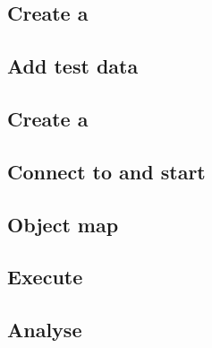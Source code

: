 

\subsection{Create a \gdcase{}}


\subsection{Add test data}


\subsection{Create a \gdsuite{}}
\label{tutorialCreateSuite}


\subsection{Connect to \gdagent and start \gdaut{}}
\label{tutorialAUT}


\subsection{Object map}
\label{tutorialOM}


\subsection{Execute}
\label{tutorialExecute}


\subsection{Analyse}

